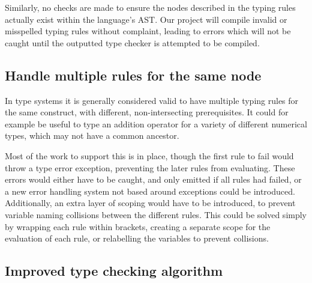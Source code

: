 \documentclass[nofilelist]{cslthse-msc}
\newcommand{\CR}[1]{\textcolor{green!60!black}{[\textbf{CR}:#1]}}
\begin{document}
Similarly, no checks are made to ensure the nodes described in the typing rules actually exist within the language's AST.
Our project will compile invalid or misspelled typing rules without complaint, leading to errors which will not be caught until the outputted type checker is attempted to be compiled.

\subsection{Handle multiple rules for the same node}
In type systems it is generally considered valid to have multiple typing rules for the same construct, with different, non-intersecting prerequisites.
It could for example be useful to type an addition operator for a variety of different numerical types, which may not have a common ancestor.

Most of the work to support this is in place, though the first rule to fail would throw a type error exception, preventing the later rules from evaluating.
These errors would either have to be caught, and only emitted if all rules had failed, or a new error handling system not based around exceptions could be introduced.
Additionally, an extra layer of scoping would have to be introduced, to prevent variable naming collisions between the different rules.
This could be solved simply by wrapping each rule within brackets, creating a separate scope for the evaluation of each rule, or relabelling the variables to prevent collisions.



\subsection{Improved type checking algorithm}


{} %
\end{document}
